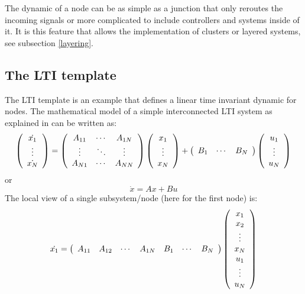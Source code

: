 \documentclass[a4paper,twoside, openright,12pt]{report}
\begin{document}
The dynamic of a node can be as simple as a junction that only reroutes the incoming signals or more complicated to include controllers and systems inside of it. It is this feature that allows
the implementation of clusters or layered systems, see subsection \ref{layering}. 


\subsection{The LTI template}

The LTI template is an example that defines a linear time invariant dynamic for nodes. The mathematical model 
of a simple interconnected LTI system as explained in \cite{LargeScaleSystems} can be written as:
\begin{eqnarray}
\left( \begin{array}{c}
\dot{x_1} \\  
\vdots \\
\dot{x_N}
\end{array} \right)=
\left( \begin{array}{ccc}
A_{11} & \cdots & A_{1N} \\  
\vdots & \ddots & \vdots\\
A_{N1} & \cdots &A_{NN}
\end{array} \right) 
\left( \begin{array}{c}
x_1 \\  
\vdots \\
x_N
\end{array} \right)+
\left( \begin{array}{c c c}
B_{1} & \cdots & B_{N}  
\end{array} \right) 
\left( \begin{array}{c}
u_1 \\  
\vdots \\
u_N
\end{array} \right)       
\end{eqnarray}
or
\begin{equation}
 \dot{x}=Ax+Bu
\end{equation}
The local view of a single subsystem/node (here for the first node) is:
\begin{eqnarray}
  \dot{x_1}= 
\left( \begin{array}{c c c c c c c}
A_{11} & A_{12} & \cdots & A_{1N} & B_{1} & \cdots & B_{N}  
\end{array} \right) 
\left( \begin{array}{c}
x_1 \\ 
x_2 \\ 
\vdots \\
x_N\\
u_1 \\  
\vdots \\
u_N
\end{array} \right)    
\end{eqnarray}
\end{document}
